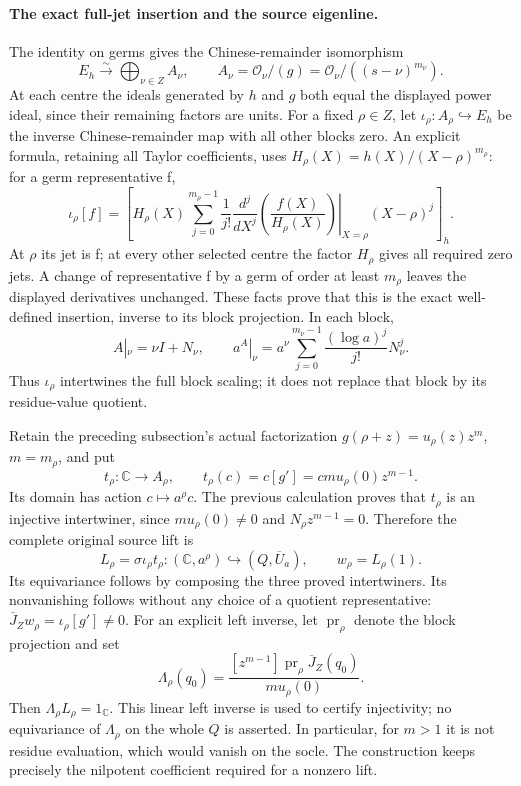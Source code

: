 \paragraph{The exact full-jet insertion and the source eigenline.}
The identity on germs gives the Chinese-remainder isomorphism
\[
 E_h\xrightarrow{\sim}\bigoplus_{\nu\in Z}A_\nu,
 \qquad A_\nu=\mathcal O_\nu/(g)
              =\mathcal O_\nu/((s-\nu)^{m_\nu}).
\]
At each centre the ideals generated by \(h\) and \(g\) both equal the
displayed power ideal, since their remaining factors are units.
For a fixed \(\rho\in Z\), let
\(\iota_\rho:A_\rho\hookrightarrow E_h\) be the inverse
Chinese-remainder map with all other blocks zero. An explicit formula,
retaining all Taylor coefficients, uses
\(H_\rho(X)=h(X)/(X-\rho)^{m_\rho}\): for a germ representative f,
\[
 \iota_\rho[f]=
 \left[H_\rho(X)\sum_{j=0}^{m_\rho-1}
 \frac{1}{j!}
 \left.\frac{d^j}{dX^j}\left(\frac{f(X)}{H_\rho(X)}\right)\right|_{X=\rho}
 (X-\rho)^j\right]_{h}.
\]
At \(\rho\) its jet is f; at every other selected centre the factor
\(H_\rho\) gives all required zero jets. A change of representative f
by a germ of order at least \(m_\rho\) leaves the displayed derivatives
unchanged. These facts prove that this is the exact well-defined
insertion, inverse to its block projection. In each block,
\[
 A|_\nu=\nu I+N_\nu,\qquad
 a^A|_\nu=a^\nu\sum_{j=0}^{m_\nu-1}
 \frac{(\log a)^j}{j!}N_\nu^j.
\]
Thus \(\iota_\rho\) intertwines the full block scaling; it does not
replace that block by its residue-value quotient.

Retain the preceding subsection's actual factorization
\(g(\rho+z)=u_\rho(z)z^m\), \(m=m_\rho\), and put
\[
 t_\rho:\mathbb C\longrightarrow A_\rho,
 \qquad t_\rho(c)=c[g']=cmu_\rho(0)z^{m-1}.
\]
Its domain has action \(c\mapsto a^\rho c\). The previous calculation
proves that \(t_\rho\) is an injective intertwiner, since
\(mu_\rho(0)\ne0\) and \(N_\rho z^{m-1}=0\). Therefore the complete
original source lift is
\[
 \boxed{L_\rho=\sigma\iota_\rho t_\rho:
 (\mathbb C,a^\rho)\hookrightarrow(Q,\overline U_a),
 \qquad w_\rho=L_\rho(1).}
\]
Its equivariance follows by composing the three proved
intertwiners. Its nonvanishing follows without any choice of a quotient
representative: \(\overline J_Zw_\rho=\iota_\rho[g']\ne0\).
For an explicit left inverse, let \(\operatorname{pr}_\rho\) denote the
block projection and set
\[
 \Lambda_\rho(q_0)=
 \frac{[z^{m-1}]\operatorname{pr}_\rho\overline J_Z(q_0)}
      {mu_\rho(0)}.
\]
Then \(\Lambda_\rho L_\rho=1_{\mathbb C}\). This linear left inverse
is used to certify injectivity; no equivariance of \(\Lambda_\rho\)
on the whole \(Q\) is asserted. In particular, for \(m>1\) it is not
residue evaluation, which would vanish on the socle. The construction
keeps precisely the nilpotent coefficient required for a nonzero lift.

